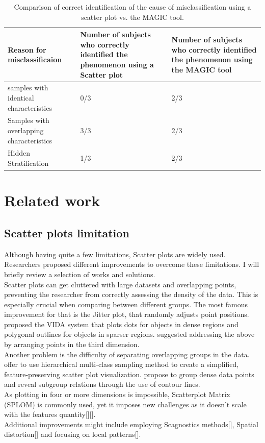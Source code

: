 \documentclass[11pt]{article}
\begin{document}
\begin{table}[h]
\centering
\begin{tabular}{ |m{5cm}||m{5cm}|m{5.5cm}| } 
\hline
Reason for misclassificaion & Number of subjects who correctly identified the phenomenon using a Scatter plot & Number of subjects who correctly identified the phenomenon using the MAGIC tool \\
\hline
\hline
samples with identical characteristics & 0/3 & 2/3 \\
\hline
Samples with overlapping characteristics & 3/3 & 2/3 \\
\hline
Hidden Stratification & 1/3 & 2/3 \\
\hline
\end{tabular}
\caption{Comparison of correct identification of the cause of misclassification using a scatter plot vs. the MAGIC tool.}
\label{table:tab2}
\end{table}

\section{Related work}\label{Related work}
\subsection{Scatter plots limitation}\label{Scatter plots limitation}
Although having quite a few limitations, Scatter plots are widely used. Researchers proposed different improvements to overcome these limitations. I will briefly review a selection of works and solutions.\\
Scatter plots can get cluttered with large datasets and overlapping points, preventing the researcher from correctly assessing the density of the data. This is especially crucial when comparing between different groups. The most famous improvement for that is the Jitter plot, that randomly adjusts point positions. \cite{woodruff1998constant} proposed the VIDA system that plots dots for objects in dense regions and polygonal outlines for objects in sparser regions. \cite{dang2010stacking} suggested addressing the above by arranging points in the third dimension.\\
Another problem is the difficulty of separating overlapping groups in the data. \cite{lee2012ieee} offer to use hierarchical multi-class sampling method to create a simplified, feature-preserving scatter plot visualization. \cite{mayorga2013splatterplots} propose to group dense data points and reveal subgroup relations through the use of contour lines.\\
As plotting in four or more dimensions is impossible, Scatterplot Matrix (SPLOM) is commonly used, yet it imposes new challenges as it doesn’t scale with the features quantity[][].\\
Additional improvements might include employing Scagnostics methods[], Spatial distortion[] and focusing on local patterns[].
\end{document}
